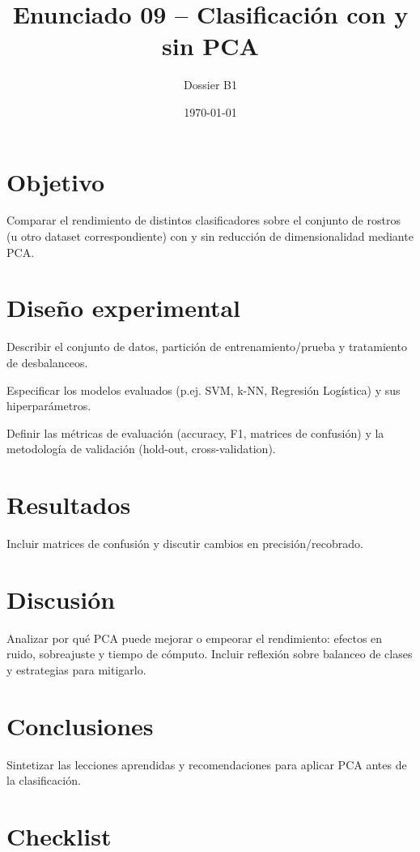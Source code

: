 \documentclass[12pt]{article}
\title{Enunciado 09 -- Clasificación con y sin PCA}
\author{Dossier B1}
\date{\today}
\begin{document}
\maketitle
\section{Objetivo}
Comparar el rendimiento de distintos clasificadores sobre el conjunto de rostros (u otro dataset correspondiente) con y sin reducción de dimensionalidad mediante PCA.

\section{Diseño experimental}
\begin{pasoapaso}
  \item Describir el conjunto de datos, partición de entrenamiento/prueba y tratamiento de desbalanceos.
  \item Especificar los modelos evaluados (p.ej. SVM, k-NN, Regresión Logística) y sus hiperparámetros.
  \item Definir las métricas de evaluación (accuracy, F1, matrices de confusión) y la metodología de validación (hold-out, cross-validation).
\end{pasoapaso}

\section{Resultados}
Incluir matrices de confusión y discutir cambios en precisión/recobrado.

\section{Discusión}
Analizar por qué PCA puede mejorar o empeorar el rendimiento: efectos en ruido, sobreajuste y tiempo de cómputo. Incluir reflexión sobre balanceo de clases y estrategias para mitigarlo.

\section{Conclusiones}
Sintetizar las lecciones aprendidas y recomendaciones para aplicar PCA antes de la clasificación.

\section*{Checklist}
\ChecklistBase
\end{document}
